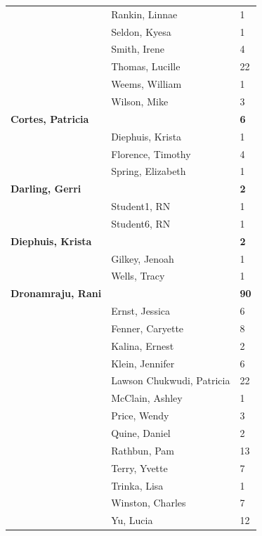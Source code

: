 \documentclass{article}\usepackage[]{graphicx}\usepackage[]{color}
\begin{document}
{\begin{longtable} { >{\raggedright}p{}|p{}p{}}
   \rowcolor[gray]{0.90} & Rankin, Linnae & 1 \\ 
   \rowcolor[gray]{0.90} & Seldon, Kyesa & 1 \\ 
   & Smith, Irene & 4 \\ 
   & Thomas, Lucille & 22 \\ 
   & Weems, William & 1 \\ 
   \rowcolor[gray]{0.90} & Wilson, Mike & 3 \\ 
   \rowcolor[gray]{0.90}\textbf{Cortes, Patricia} &  & \hspace{2cm}\textbf{6} \\ 
   \rowcolor[gray]{0.90} & Diephuis, Krista & 1 \\ 
   & Florence, Timothy & 4 \\ 
   & Spring, Elizabeth & 1 \\ 
  \textbf{Darling, Gerri} &  & \hspace{2cm}\textbf{2} \\ 
   \rowcolor[gray]{0.90} & Student1, RN & 1 \\ 
   \rowcolor[gray]{0.90} & Student6, RN & 1 \\ 
   \rowcolor[gray]{0.90}\textbf{Diephuis, Krista} &  & \hspace{2cm}\textbf{2} \\ 
   & Gilkey, Jenoah & 1 \\ 
   & Wells, Tracy & 1 \\ 
  \textbf{Dronamraju, Rani} &  & \hspace{2cm}\textbf{90} \\ 
   \rowcolor[gray]{0.90} & Ernst, Jessica & 6 \\ 
   \rowcolor[gray]{0.90} & Fenner, Caryette & 8 \\ 
   \rowcolor[gray]{0.90} & Kalina, Ernest & 2 \\ 
   & Klein, Jennifer & 6 \\ 
   & Lawson Chukwudi, Patricia & 22 \\ 
   & McClain, Ashley & 1 \\ 
   \rowcolor[gray]{0.90} & Price, Wendy & 3 \\ 
   \rowcolor[gray]{0.90} & Quine, Daniel & 2 \\ 
   \rowcolor[gray]{0.90} & Rathbun, Pam & 13 \\ 
   & Terry, Yvette & 7 \\ 
   & Trinka, Lisa & 1 \\ 
   & Winston, Charles & 7 \\ 
   \rowcolor[gray]{0.90} & Yu, Lucia & 12 \\ 

\end{longtable}}
\end{document}
